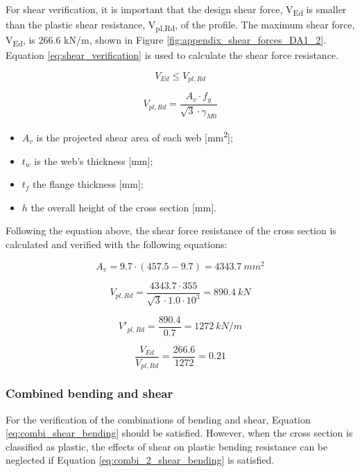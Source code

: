 For shear verification, it is important that the design shear force, V\textsubscript{Ed} is smaller than the plastic shear resistance, V\textsubscript{pl,Rd}, of the profile. The maximum shear force, V\textsubscript{Ed}, is 266.6 kN/m, shown in Figure \ref{fig:appendix_shear_forces_DA1_2}. Equation \ref{eq:shear_verification} is used to calculate the shear force resistance.

\begin{equation}
    V_{Ed} \leq V_{pl,Rd}
    \label{eq:shear_plastic}
\end{equation}

\begin{equation}
    V_{pl,Rd} = \frac{A_v \cdot f_{y}}{\sqrt{3} \cdot \gamma_{M0}}
    \label{eq:shear_verification}
\end{equation}

\newpage

\begin{itemize}
    \item $A_{v}$ is the projected shear area of each web [mm\textsuperscript{2}];
    \item $t_w$ is the web’s thickness [mm];
    \item $t_f$ the flange thickness [mm];
    \item $h$ the overall height of the cross section [mm].
\end{itemize}

Following the equation above, the shear force resistance of the cross section is calculated and verified with the following equations:

$$
    A_v = 9.7 \cdot (457.5 - 9.7) = 4343.7 \ mm^2
$$

$$
    V_{pl,Rd} = \frac{4343.7 \cdot 355}{\sqrt{3} \cdot 1.0 \cdot 10^3} = 890.4 \ kN 
$$

$$
    V'_{pl,Rd} = \frac{890.4}{0.7} = 1272 \ kN/m 
$$

$$
    \frac{V_{Ed}}{V_{pl,Rd}} = \frac{266.6}{1272} = 0.21 
$$

\subsubsection{Combined bending and shear}

For the verification of the combinations of bending and shear, Equation \ref{eq:combi_shear_bending} should be satisfied. However, when the cross section is classified as plastic, the effects of shear on plastic bending resistance can be neglected if Equation \ref{eq:combi_2_shear_bending} is satisfied. 

